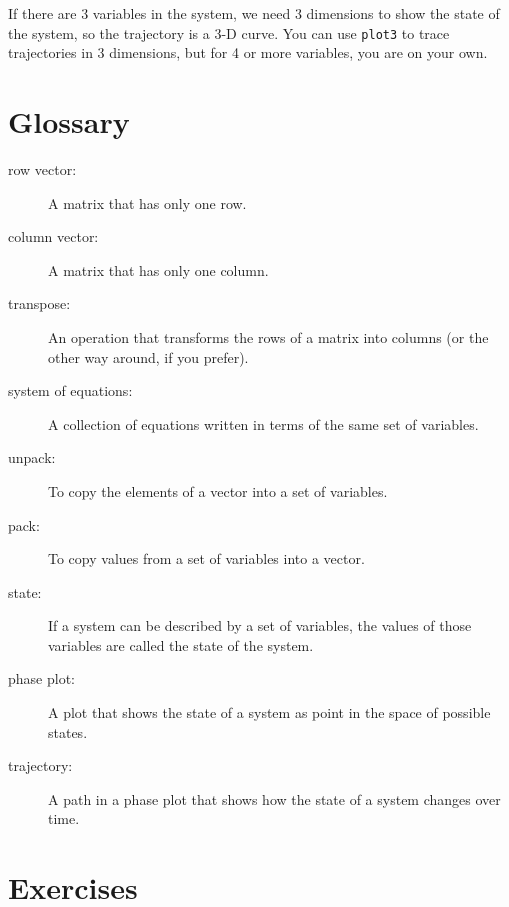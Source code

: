 \documentclass[
]{book}
\begin{document}
If there are 3 variables in the system, we need 3 dimensions to show
the state of the system, so the trajectory is a 3-D curve.
You can use {\tt plot3} to trace trajectories in 3 dimensions,
but for 4 or more variables, you are on your own.


\section{Glossary}

\begin{description}

\item[row vector:] A matrix that has only one row.

\item[column vector:] A matrix that has only one column.

\item[transpose:] An operation that transforms the rows of a matrix
into columns (or the other way around, if you prefer).

\item[system of equations:] A collection of equations written in terms of
the same set of variables.

\item[unpack:] To copy the elements of a vector into a set of variables.

\item[pack:] To copy values from a set of variables into a vector.

\item[state:] If a system can be described by a set of variables,
the values of those variables are called the state of the system.

\item[phase plot:] A plot that shows the state of a system as point
in the space of possible states.

\item[trajectory:] A path in a phase plot that shows how the state of
a system changes over time.


\end{description}

\section{Exercises}
\end{document}
